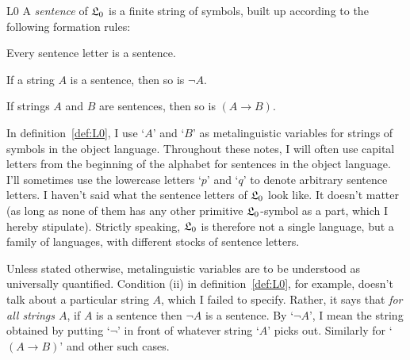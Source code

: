 \begin{definition}{}{L0}
  A \emph{sentence} of $\mathfrak{L}_{0}$ is a finite string of symbols,
  built up according to the following formation rules:
  \begin{cenumerate}
    \item[(i)] Every sentence letter is a sentence.
    \item[(ii)] If a string $A$ is a sentence, then so is $\neg A$.
    \item[(iii)] If strings $A$ and $B$ are sentences, then so is $(A \to B)$.
  \end{cenumerate}
\end{definition}

In definition~\ref{def:L0},
I use `$A$' and `$B$' as metalinguistic variables for strings of symbols in the object language.
Throughout these notes,
I will often use capital letters from the beginning of the alphabet for
sentences in the object language.
I'll sometimes use the lowercase letters `$p$' and `$q$' to denote arbitrary sentence letters.
I haven't said what the sentence letters of $\mathfrak{L}_{0}$ look like.
It doesn't matter
(as long as none of them has any other primitive $\mathfrak{L}_{0}$-symbol as a part,
which I hereby stipulate).
Strictly speaking, $\mathfrak{L}_{0}$ is therefore not a single language,
but a family of languages, with different stocks of sentence letters.

Unless stated otherwise,
metalinguistic variables are to be understood as universally quantified.
Condition (ii) in definition~\ref{def:L0}, for example, doesn't talk about
a particular string $A$,
which I failed to specify.
Rather,
it says that \emph{for all strings $A$},
if $A$ is a sentence then $\neg A$ is a sentence.
By `$\neg A$',
I mean the string obtained by putting `$\neg$' in front of whatever string `$A$' picks out.
Similarly for `$(A \to B)$' and other such cases.



